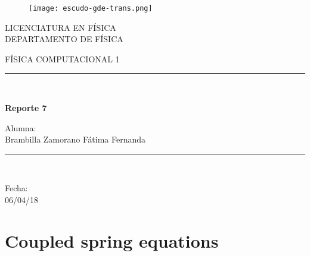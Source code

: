 \documentclass{article}
\begin{document}
\begin{titlepage}
\begin{center}
    \vspace*{-1in}
    \begin{figure}[htb]
    \begin{center}
    \texttt{[image: escudo-gde-trans.png]}
    \end{center}
\end{figure}
\begin{center}
LICENCIATURA EN FÍSICA \\
\vspace*{0.15in}
DEPARTAMENTO DE FÍSICA \\
\vspace*{0.6in}
\begin{large}
FÍSICA COMPUTACIONAL 1 \\
\end{large}
\vspace*{0.2in}
\rule{80mm}{0.1mm}\\
\vspace*{0.1in}
\begin{large}
\textbf{Reporte 7\\ }
\end{large}
\vspace*{0.3in}
\begin{large}
Alumna: \\
\vspace*{0.1in}
Brambilla Zamorano Fátima Fernanda\\
\end{large}
\vspace*{0.3in}
\rule{80mm}{0.1mm}\\
\vspace*{0.1in}
\begin{large}
Fecha: \\ 06/04/18\\
\end{large}
\end{center}
\end{center}
\end{titlepage}

\section{Coupled spring equations}
\end{document}
